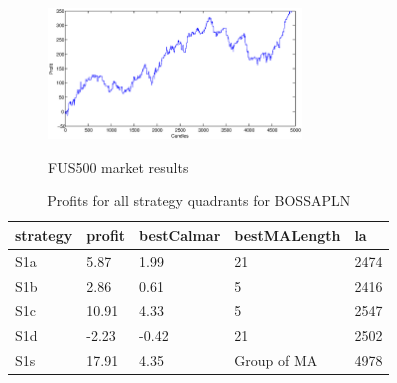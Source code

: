 \documentclass{tewiart}
\begin{document}
\begin{figure}[h]
\begin{minipage}{.49\linewidth}
\label{mansard}
\end{minipage}
\begin{minipage}{\linewidth}
\centering 
\includegraphics[width=0.6\textwidth]{images/S1s_fus.eps}
\label{mansard}
\end{minipage}
\caption{FUS500 market results}
\end{figure}
\FloatBarrier


\newpage
\begin{table}[!t]
\caption{Profits for all strategy quadrants for BOSSAPLN} 
 \begin{center} 
 \begin{tabular}{|l|l|l|l|l|} 
 \hline \textbf{strategy} & \textbf{profit} & \textbf{bestCalmar} & \textbf{bestMALength} & \textbf{la} \\ \hline  
S1a & 5.87 & 1.99 & 21 & 2474\\ \hline 
S1b & 2.86 & 0.61 & 5 & 2416\\ \hline 
S1c & 10.91 & 4.33 & 5 & 2547\\ \hline 
S1d & -2.23 & -0.42 & 21 & 2502\\ \hline 
S1s & 17.91 & 4.35 & Group of MA & 4978\\ 
\hline \end{tabular} 
 \end{center} 
 \end{table}
\FloatBarrier
\end{document}
